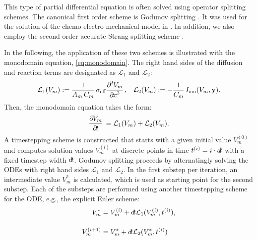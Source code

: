 This type of partial differential equation is often solved using operator splitting schemes. The canonical first order scheme is Godunov splitting \cite{Godunov2003}. It was used for the solution of the chemo-electro-mechanical model in \cite{Roehrle2012}. In addition, we also employ the second order accurate Strang splitting scheme \cite{Strang1968}.

In the following, the application of these two schemes is illustrated with the monodomain equation, \cref{eq:monodomain}. The right hand sides of the diffusion and reaction terms are designated as $\mathcal{L}_1$ and $\mathcal{L}_2$:%
\begin{align*}
  \mathcal{L}_1(V_m) := \dfrac{1}{A_m\,C_m} \sigma_\text{eff}\dfrac{\partial^2 V_m}{\partial x^2}, &&
  \mathcal{L}_2(V_m) := -\dfrac{1}{C_m} I_\text{ion}(V_m,\bfy).
\end{align*}
%
Then, the monodomain equation takes the form:
%
\begin{align*}
  \p{V_m}{t} = \mathcal{L}_1(V_m) + \mathcal{L}_2(V_m).
\end{align*}
%
A timestepping scheme is constructed that starts with a given initial value $V_m^{(0)}$ and computes solution values $V_m^{(i)}$ at discrete points in time $t^{(i)} = i\cdot\dt$ with a fixed timestep width $\dt$.
Godunov splitting proceeds by alternatingly solving the ODEs with right hand sides $\mathcal{L}_1$ and $\mathcal{L}_2$. In the first substep per iteration, an intermediate value $V_m^{\ast}$ is calculated, which is used as starting point for the second substep. Each of the substeps are performed using another timestepping scheme for the ODE, e.g., the explicit Euler scheme:
%
\begin{subequations}\label{eq:monodomain_godunov}
  \begin{align}
    V_m^{\ast} &= V_m^{(i)} + \dt \mathcal{L}_1(V_m^{(i)},t^{(i)}),\\[4mm]
    V_m^{(i+1)} &= V_m^{\ast} + \dt \mathcal{L}_2(V_m^{\ast},t^{(i)})
  \end{align}
\end{subequations}

